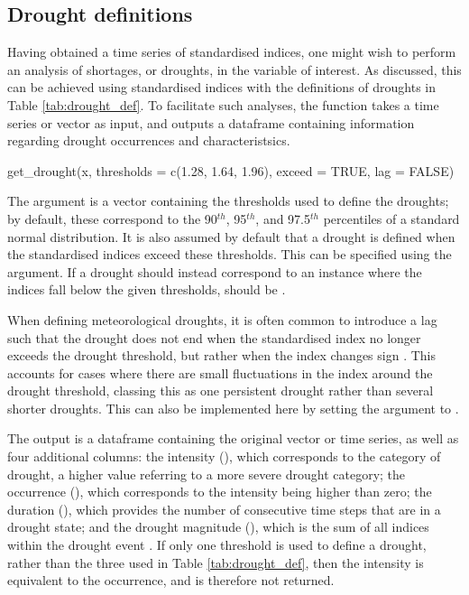 \documentclass[article,shortnames,nojss]{jss}\usepackage[]{graphicx}\usepackage[]{xcolor}
\begin{document}
\subsection{Drought definitions}

Having obtained a time series of standardised indices, one might wish to perform an analysis of shortages, or droughts, in the variable of interest. As discussed, this can be achieved using standardised indices with the definitions of droughts in Table \ref{tab:drought_def}. To facilitate such analyses, the  function takes a time series or vector  as input, and outputs a dataframe containing information regarding drought occurrences and characteristsics.

\begin{Code}
get_drought(x, thresholds = c(1.28, 1.64, 1.96), exceed = TRUE, lag = FALSE)
\end{Code}


The argument  is a vector containing the thresholds used to define the droughts; by default, these correspond to the 90$^{th}$, 95$^{th}$, and 97.5$^{th}$ percentiles of a standard normal distribution. It is also assumed by default that a drought is defined when the standardised indices exceed these thresholds. This can be specified using the  argument. If a drought should instead correspond to an instance where the indices fall below the given thresholds,  should be .

When defining meteorological droughts, it is often common to introduce a lag such that the drought does not end when the standardised index no longer exceeds the drought threshold, but rather when the index changes sign \citep[e.g.][]{McKeeEtAl1993}. This accounts for cases where there are small fluctuations in the index around the drought threshold, classing this as one persistent drought rather than several shorter droughts. This can also be implemented here by setting the  argument to .

The output is a dataframe containing the original vector or time series, as well as four additional columns: the intensity (), which corresponds to the category of drought, a higher value referring to a more severe drought category; the occurrence (), which corresponds to the intensity being higher than zero; the duration (), which provides the number of consecutive time steps that are in a drought state; and the drought magnitude (), which is the sum of all indices within the drought event \citep[see][for details]{McKeeEtAl1993}. If only one threshold is used to define a drought, rather than the three used in Table \ref{tab:drought_def}, then the intensity is equivalent to the occurrence, and is therefore not returned.
\end{document}
